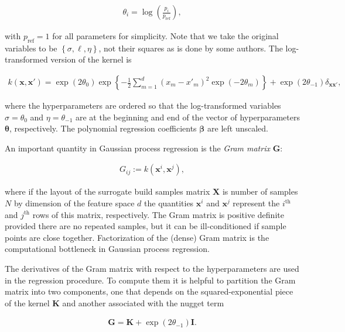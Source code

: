 \begin{gather}
\theta_i = \log \left( \frac{p_i}{p_{\text{ref}}} \right),
\end{gather}

\noindent with $p_{\text{ref}} = 1$ for all parameters for simplicity. Note
that we take the original variables to be 
$\left\lbrace \sigma, \boldsymbol{\ell}, \eta \right\rbrace$, not their 
squares as is done by some authors. The log-transformed version of the kernel
is

\begin{gather}
k(\boldsymbol{x},\boldsymbol{x}') = \exp( 2 \theta_0 ) \exp \left\lbrace - \frac{1}{2} \sum_{m=1}^{d} \left(x_m - x'_m \right)^2 \exp(-2 \theta_m) \right\rbrace + \exp(2 \theta_{-1})  \delta_{\boldsymbol{x}\boldsymbol{x}'} ,
\end{gather}

\noindent where the hyperparameters are ordered so that the log-transformed
variables $\sigma = \theta_0$ and $\eta = \theta_{-1}$ are at the beginning and end of
the vector of hyperparameters $\boldsymbol{\theta}$, respectively. The 
polynomial regression coefficients $\boldsymbol{\beta}$ are left unscaled.


An important quantity in Gaussian process regression is the 
\textit{Gram matrix} $\boldsymbol{G}$:

\begin{gather}
G_{ij} := k(\boldsymbol{x}^i,\boldsymbol{x}^j),
\end{gather}

\noindent where if the layout of the surrogate build samples matrix 
$\boldsymbol{X}$ is number of samples $N$ by dimension of the feature space
$d$ the quantities $\boldsymbol{x}^i$ and $\boldsymbol{x}^j$ represent the 
$i^{\text{th}}$ and $j^{\text{th}}$ rows of this matrix, respectively. The 
Gram matrix is positive definite provided there are no repeated samples, but
it can be ill-conditioned if sample points are close together. Factorization
of the (dense) Gram matrix is the computational bottleneck in Gaussian 
process regression.

The derivatives of the Gram matrix with respect to the hyperparameters are 
used in the regression procedure. To compute them it is helpful to partition
the Gram matrix into two components, one that depends on the 
squared-exponential piece of the kernel $\boldsymbol{K}$ and another 
associated with the nugget term

\begin{gather}
\boldsymbol{G} =  \boldsymbol{K} + \exp(2 \theta_{-1})  \boldsymbol{I}.
\end{gather}

